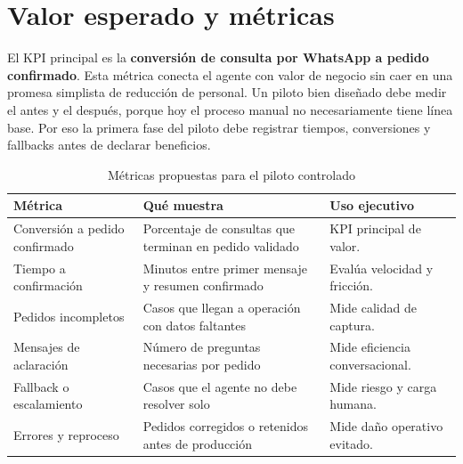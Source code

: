 \section{Valor esperado y métricas}

El KPI principal es la \textbf{conversión de consulta por WhatsApp a pedido confirmado}. Esta métrica conecta el agente con valor de negocio sin caer en una promesa simplista de reducción de personal. Un piloto bien diseñado debe medir el antes y el después, porque hoy el proceso manual no necesariamente tiene línea base. Por eso la primera fase del piloto debe registrar tiempos, conversiones y fallbacks antes de declarar beneficios.

\begin{table}[htbp]
\centering
\caption{Métricas propuestas para el piloto controlado}%
\label{tab:metricas}
\small
\begin{tabular}{@{}>{\raggedright\arraybackslash}p{4cm}>{\raggedright\arraybackslash}p{6.2cm}>{\raggedright\arraybackslash}p{4cm}@{}}
\toprule
\textbf{Métrica} & \textbf{Qué muestra} & \textbf{Uso ejecutivo} \\ \midrule
Conversión a pedido confirmado & Porcentaje de consultas que terminan en pedido validado & KPI principal de valor. \\
Tiempo a confirmación & Minutos entre primer mensaje y resumen confirmado & Evalúa velocidad y fricción. \\
Pedidos incompletos & Casos que llegan a operación con datos faltantes & Mide calidad de captura. \\
Mensajes de aclaración & Número de preguntas necesarias por pedido & Mide eficiencia conversacional. \\
Fallback o escalamiento & Casos que el agente no debe resolver solo & Mide riesgo y carga humana. \\
Errores y reproceso & Pedidos corregidos o retenidos antes de producción & Mide daño operativo evitado. \\ \bottomrule
\end{tabular}
\end{table}

